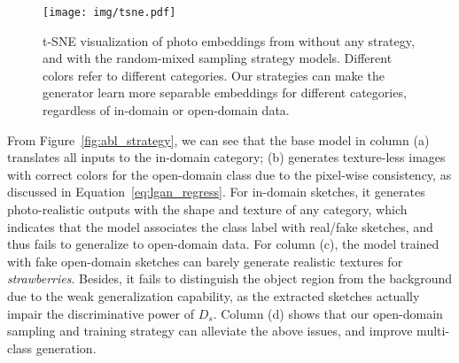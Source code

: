 \documentclass[10pt,twocolumn,letterpaper]{article}
\begin{document}
\begin{figure*}[htbp]
    \centering
    \texttt{[image: img/tsne.pdf]}
\caption{t-SNE visualization of photo embeddings from without any strategy, and with the random-mixed sampling strategy models. Different colors refer to different categories. Our strategies can make the generator learn more separable embeddings for different categories, regardless of in-domain or open-domain data.}
    \label{fig:tsne_strategies}
\end{figure*}

From Figure~\ref{fig:abl_strategy}, we can see that the base model in column (a) translates all inputs to the in-domain category; (b) generates texture-less images with correct colors for the open-domain class due to the pixel-wise consistency, as discussed in Equation~\ref{eq:lgan_regress}. For in-domain sketches, it generates photo-realistic outputs with the shape and texture of any category, which indicates that the model associates the class label with real/fake sketches, and thus fails to generalize to open-domain data. For column (c), the model trained with fake open-domain sketches can barely generate realistic textures for \textit{strawberries}. Besides, it fails to distinguish the object region from the background due to the weak generalization capability, as the extracted sketches actually impair the discriminative power of $D_s$. Column (d) shows that our open-domain sampling and training strategy can alleviate the above issues, and improve multi-class generation. 
\end{document}
